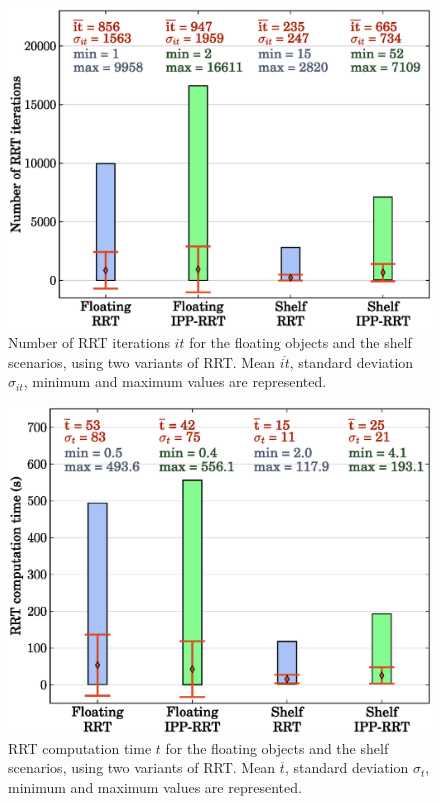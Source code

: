 \documentclass{article}
\begin{document}
\begin{figure}[h]
\centering
\includegraphics[width=0.8\linewidth]{plots/rrt-it.eps}
\caption{Number of RRT iterations $it$ for the floating objects and the
  shelf scenarios, using two variants of RRT. Mean $\overline{it}$,
  standard deviation $\sigma_{it}$, minimum and maximum values are
  represented.}
\label{fig:rrt-it}
\end{figure}

\begin{figure}[h]
\centering
\includegraphics[width=0.8\linewidth]{plots/rrt-t.eps}
\caption{RRT computation time $t$ for the floating objects and the shelf
  scenarios, using two variants of RRT. Mean $\overline{t}$, standard
  deviation $\sigma_{t}$, minimum and maximum values are represented.}
\label{fig:rrt-t}
\end{figure}
\end{document}
